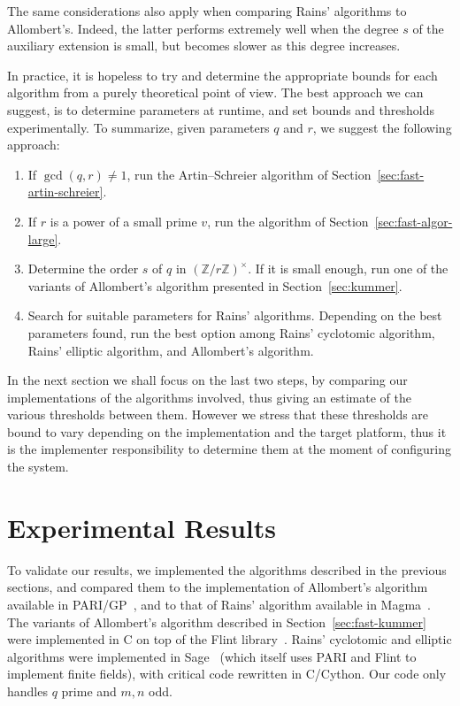 \documentclass{mcom-l}
\theoremstyle{plain}
\theoremstyle{definition}
\newcommand{\Z}{\ensuremath{\mathbb{Z}}}
\newcounter{algorithm}
\begin{document}
The same considerations also apply when comparing Rains' algorithms to
Allombert's. Indeed, the latter performs extremely well when the
degree $s$ of the auxiliary extension is small, but becomes slower as
this degree increases.

In practice, it is hopeless to try and determine the appropriate
bounds for each algorithm from a purely theoretical point of view. The
best approach we can suggest, is to determine parameters at runtime,
and set bounds and thresholds experimentally.
To summarize, given parameters $q$ and $r$, we suggest
the following approach:
\begin{enumerate}
\item If $\gcd(q,r)\ne 1$, run the Artin--Schreier algorithm of
  Section~\ref{sec:fast-artin-schreier}.
\item If $r$ is a power of a small prime $v$, run the algorithm of
  Section~\ref{sec:fast-algor-large}.
\item Determine the order $s$ of $q$ in $(\Z/r\Z)^\times$. If it is
  small enough, run one of the variants of Allombert's algorithm
  presented in Section~\ref{sec:kummer}.
\item Search for suitable parameters for Rains' algorithms. %
  Depending on the best parameters found, run the best option among
  Rains' cyclotomic algorithm, Rains' elliptic algorithm, and
  Allombert's algorithm.
\end{enumerate}

In the next section we shall focus on the last two steps, by comparing
our implementations of the
algorithms involved, thus giving an estimate of the various thresholds
between them.  However we stress that these thresholds are bound to
vary depending on the implementation and the target platform, thus it
is the implementer responsibility to determine them at the moment of
configuring the system.


\section{Experimental Results}
\label{sec:experimental-results}

To validate our results, we implemented the algorithms described in
the previous sections, and compared them to the implementation of
Allombert's algorithm available in PARI/GP~\cite{Pari}, and to that of
Rains' algorithm available in Magma~\cite{MAGMA}. %
The variants of Allombert's algorithm described in
Section~\ref{sec:fast-kummer} were implemented in C on top of the
Flint library~\cite{hart2010flint}. Rains' cyclotomic and elliptic
algorithms were implemented in Sage~\cite{Sage} (which itself uses
PARI and Flint to implement finite fields), with critical code
rewritten in C/Cython.  Our code only handles $q$ prime and $m,n$ odd.
\end{document}
